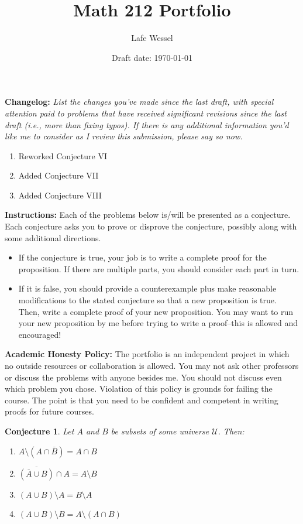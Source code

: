 \documentclass[11pt,titlepage]{article}		%
\title{\sc Math 212 Portfolio}
\author{Lafe Wessel}
\date{Draft date: \today}
\theoremstyle{theorem}
\newtheorem{conjecture}[theorem]{Conjecture}
\begin{document}
\maketitle


\noindent\textbf{Changelog:} \emph{List the changes you've made since the last draft, with special attention paid to problems that have received significant revisions since the last draft (i.e., more than fixing typos). If there is any additional information you'd like me to consider as I review this submission, please say so now.}

\begin{enumerate}
\item Reworked Conjecture VI
\item Added Conjecture VII
\item Added Conjecture VIII
\end{enumerate}

\noindent\textbf{Instructions:} Each of the problems below is/will be presented as a conjecture. Each conjecture asks you to prove or disprove the conjecture, possibly along with some additional directions. 

\bigskip

\begin{itemize}  
	\item If the conjecture is true, your job is to write a complete proof for the proposition. If there are multiple parts, you should consider each part in turn.
	\item If it is false, you should provide a counterexample plus make reasonable modifications to the stated conjecture so that a new proposition is true. Then, write a complete proof of your new proposition. You may want to run your new proposition by me before trying to write a proof--this is allowed and encouraged!
\end{itemize}


\noindent\textbf{Academic Honesty Policy:}
The portfolio is an independent project in which no outside resources or collaboration is allowed. You may not ask other professors or discuss the problems with anyone besides me. You should not discuss even which problem you chose. Violation of this policy is grounds for failing the course. The point is that you need to be confident and competent in writing proofs for future courses.






\clearpage

\begin{conjecture}
	Let $A$ and $B$ be subsets of some universe $\mathcal{U}$.
	Then:
	\begin{enumerate}
		\item $A\setminus (A\cap \overline{B}) = A\cap B$
		\item $\overline{(\overline{A}\cup B)} \cap A = A\setminus B$
		\item $(A\cup B)\setminus A = B\setminus A$
		\item $(A\cup B) \setminus B = A\setminus (A\cap B)$
	\end{enumerate}
\end{conjecture}
\end{document}
